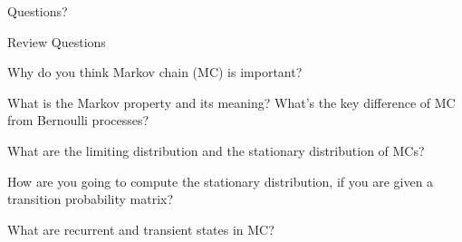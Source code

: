 \begin{frame}{}
\vspace{2cm}
\LARGE Questions?

\end{frame}

\begin{frame}{Review Questions}

\bce[1)]
\item Why do you think Markov chain (MC) is important?

\item What is the Markov property and its meaning? What's the key difference of MC from Bernoulli processes?

\item What are the limiting distribution and the stationary distribution of MCs?

\item How are you going to  compute the stationary distribution, if you are given a transition probability matrix?

\item What are recurrent and transient states in MC?


\ece

\end{frame}





  





